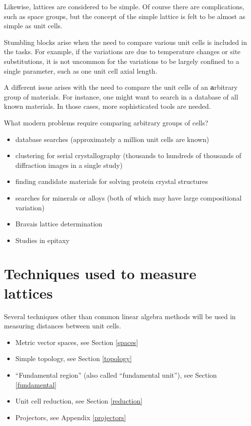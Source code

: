 \documentclass[preprint]{iucr}              %
\numberwithin{equation}{section}
\begin{document}
Likewise, lattices are considered to be simple. Of course
there are complications, such as space groups, but the concept
of the simple lattice is felt to be almost as simple as
unit cells.
	
Stumbling blocks arise when the need to compare various unit
cells is included in the tasks. For example, if the variations are due
to temperature changes or site substitutions, it is not
uncommon for the variations to be largely confined to a single
parameter, such as one unit cell axial length. 

A different issue arises with the need to compare the unit
cells of an \textbf{a}rbitrary group of materials. For instance, one
might want to search in a database of all known materials. In
those cases, more sophisticated tools are needed. 

What modern problems require comparing arbitrary groups of cells?
\begin{itemize}
	\item database searches (approximately a million unit cells are known)
	\item clustering for serial crystallography (thousands to hundreds of thousands of diffraction images in a single study)
	\item finding candidate materials for solving protein crystal structures 
	\cite{nanao2022id23}
	\item searches for minerals or alloys (both of which may have large compositional variation)
	\item Bravais lattice determination
	\item Studies in epitaxy \cite{yang2014unit}
\end{itemize}

	
\section{Techniques used to measure lattices}

Several techniques other than common linear algebra methods will be used in measuring distances between unit cells.
\begin{itemize}
	\item 	Metric vector spaces, see Section \ref{spaces}
	\item 	Simple topology, see Section \ref{topology}
	\item   ``Fundamental region'' (also called ``fundamental unit''),
	see Section \ref{fundamental}
	\item 	Unit cell reduction, see Section \ref{reduction}
	\item 	Projectors, see Appendix \ref{projectors}

\end{itemize}	
\end{document}
